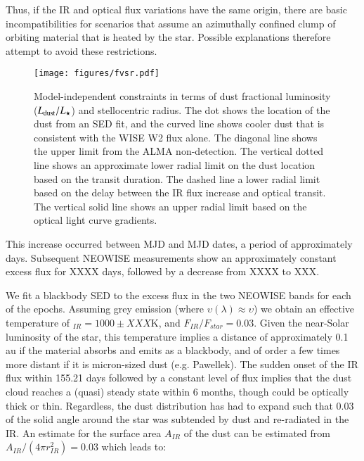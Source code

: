 \documentclass{aa}
\begin{document}
Thus, if the IR and optical flux variations have the same origin, there are basic incompatibilities for scenarios that assume an azimuthally confined clump of orbiting material that is heated by the star.
%
Possible explanations therefore attempt to avoid these restrictions.

\begin{figure}
    \centering
    \texttt{[image: figures/fvsr.pdf]}
    \caption{Model-independent constraints in terms of dust fractional luminosity ($L_{\rm dust}/L_\star$) and stellocentric radius.
    The dot shows the location of the dust from an SED fit, and the curved line shows cooler dust that is consistent with the WISE W2 flux alone.
    The diagonal line shows the upper limit from the ALMA non-detection.
    The vertical dotted line shows an approximate lower radial limit on the dust location based on the transit duration.
    The dashed line a lower radial limit based on the delay between the IR flux increase and optical transit.
    The vertical solid line shows an upper radial limit based on the optical light curve gradients.}
    \label{fig:constr}
\end{figure}

This increase occurred between MJD  and MJD  dates, a period of approximately  days.
%
Subsequent NEOWISE measurements show an approximately constant excess flux for XXXX days, followed by a decrease from XXXX to XXX.

We fit a blackbody SED to the excess flux in the two NEOWISE bands for each of the epochs.
%
Assuming grey emission (where $\upsilon(\lambda)\approx \upsilon$) we obtain an effective temperature of $_{IR} = 1000\pm XXX$K, and $F_{IR}/F_{star}=0.03$.
%
Given the near-Solar luminosity of the star, this temperature implies a distance of approximately 0.1\,au if the material absorbs and emits as a blackbody, and of order a few times more distant if it is micron-sized dust (e.g. Pawellek). 
%
The sudden onset of the IR flux within 155.21 days followed by a constant level of flux implies that the dust cloud reaches a (quasi) steady state within 6 months, though could be optically thick or thin.
%
Regardless, the dust distribution has had to expand such that 0.03 of the solid angle around the star was subtended by dust and re-radiated in the IR.
%
An estimate for the surface area $A_{IR}$ of the dust can be estimated from $A_{IR}/(4\pi r_{IR}^2) = 0.03$ which leads to:
\end{document}
